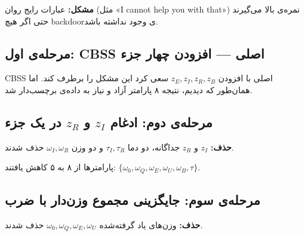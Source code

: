 \documentclass[12pt, a4paper]{article}
\newcommand{\en}[1]{\textenglish{#1}}
\newcommand{\cut}[1]{\textcolor{nored}{\textbf{حذف:}} #1}
\newcommand{\keep}[1]{\textcolor{yesgreen}{\textbf{نگه‌داشته‌شده:}} #1}
\newcommand{\param}[1]{\textcolor{accent}{\texttt{#1}}}
\begin{document}
\begin{cutbox}
\textbf{مشکل:} عبارات رایج روان (مثل «\en{I cannot help you with that}»)
نمره‌ی بالا می‌گیرند حتی اگر هیچ \en{backdoor}ی وجود نداشته باشد.
\end{cutbox}

\subsection{مرحله‌ی اول: \en{CBSS} اصلی --- افزودن چهار جزء}

\en{CBSS} اصلی با افزودن \param{$z_E, z_I, z_R, z_B$} سعی کرد این مشکل را برطرف کند. اما همان‌طور که دیدیم، نتیجه ۸ پارامتر آزاد و نیاز به داده‌ی برچسب‌دار شد.

\subsection{مرحله‌ی دوم: ادغام \en{$z_I$} و \en{$z_R$} در یک جزء}

\begin{cutbox}
\cut{\param{$z_I$} و \param{$z_R$} جداگانه، دو دما \param{$\tau_I, \tau_R$} و دو وزن \param{$\omega_I, \omega_R$}} حذف شدند.
\end{cutbox}


پارامترها از ۸ به ۵ کاهش یافتند: \param{$\{\omega_0, \omega_Q, \omega_E, \omega_U, \omega_B, \tau\}$}.

\subsection{مرحله‌ی سوم: جایگزینی مجموع وزن‌دار با ضرب}

\begin{cutbox}
\cut{وزن‌های یاد گرفته‌شده \param{$\omega_0, \omega_Q, \omega_E, \omega_U$}} حذف شدند.
\end{cutbox}
\end{document}
